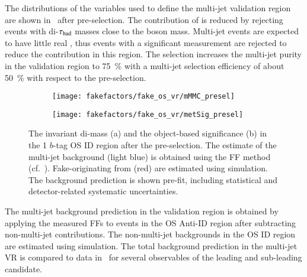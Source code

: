 The distributions of the variables used to define the multi-jet validation
region are shown in~ after pre-selection. The
contribution of \Zjets is reduced by rejecting events with di-$\tau_{\text{had}}$ masses
close to the \PZ boson mass.  Multi-jet events are expected to have little real
\pTmissAbs, thus events with a significant \pTmissAbs measurement are rejected
to reduce the \ttbar contribution in this region. The selection increases the
multi-jet purity in the validation region to \SI{75}{\percent} with a multi-jet
selection efficiency of about \SI{50}{\percent} with respect to the
pre-selection.

\begin{figure}[htbp]
  \centering

  \begin{subfigure}{0.44\textwidth}
    \texttt{[image: fakefactors/fake\_os\_vr/mMMC\_presel]}
    \subcaption{}
  \end{subfigure}\hspace*{0.04\textwidth}%
  \begin{subfigure}{0.44\textwidth}
    \texttt{[image: fakefactors/fake\_os\_vr/metSig\_presel]}
    \subcaption{}
  \end{subfigure}

  \caption{The invariant di-\tauhad mass (a) and the object-based \pTmissAbs
    significance (b) in the 1 $b$-tag OS ID region after the pre-selection. The
    estimate of the multi-jet background (light blue) is obtained using the FF
    method (cf.\ ). Fake-\tauhadvis originating
    from \ttbar (red) are estimated using simulation. The background prediction
    is shown pre-fit, including statistical and detector-related systematic
    uncertainties.}
  \label{fig:fake_factor_OSVR_cutvars}
\end{figure}

The multi-jet background prediction in the validation region is obtained by
applying the measured FFs to events in the OS Anti-ID region after subtracting
non-multi-jet contributions. The non-multi-jet backgrounds in the OS ID region
are estimated using simulation. The total background prediction in the multi-jet
VR is compared to data in~ for several
observables of the leading and sub-leading \tauhadvis candidate.

